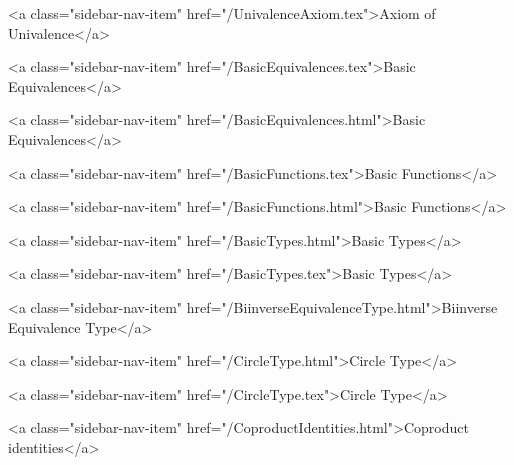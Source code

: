           <a class="sidebar-nav-item" href="/UnivalenceAxiom.tex">Axiom of Univalence</a>
        
      
    
      
        
          <a class="sidebar-nav-item" href="/BasicEquivalences.tex">Basic Equivalences</a>
        
      
    
      
        
          <a class="sidebar-nav-item" href="/BasicEquivalences.html">Basic Equivalences</a>
        
      
    
      
        
          <a class="sidebar-nav-item" href="/BasicFunctions.tex">Basic Functions</a>
        
      
    
      
        
          <a class="sidebar-nav-item" href="/BasicFunctions.html">Basic Functions</a>
        
      
    
      
        
          <a class="sidebar-nav-item" href="/BasicTypes.html">Basic Types</a>
        
      
    
      
        
          <a class="sidebar-nav-item" href="/BasicTypes.tex">Basic Types</a>
        
      
    
      
        
          <a class="sidebar-nav-item" href="/BiinverseEquivalenceType.html">Biinverse Equivalence Type</a>
        
      
    
      
        
          <a class="sidebar-nav-item" href="/CircleType.html">Circle Type</a>
        
      
    
      
        
          <a class="sidebar-nav-item" href="/CircleType.tex">Circle Type</a>
        
      
    
      
        
          <a class="sidebar-nav-item" href="/CoproductIdentities.html">Coproduct identities</a>
        
      
    
